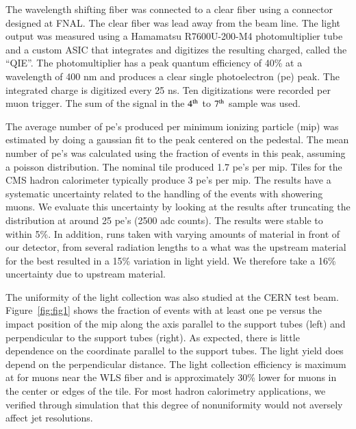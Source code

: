 \documentclass[review]{elsarticle}
\begin{document}
The wavelength shifting fiber was connected to a clear fiber using a
connector designed at FNAL.  The clear fiber was lead away from the
beam line.  The light output was measured using a Hamamatsu
R7600U-200-M4 photomultiplier tube and a custom ASIC that integrates
and digitizes the resulting charged, called the ``QIE''\cite{qie}.
The photomultiplier has a peak quantum efficiency of 40\% at a
wavelength of 400 nm and produces a clear single photoelectron (pe)
peak.  The integrated charge is digitized every 25 ns.  Ten
digitizations were recorded per muon trigger.  The sum of the signal
in the ${\rm 4^{th}}$ to ${\rm 7^{th}}$ sample was used.


The average number of pe's produced per minimum ionizing particle
(mip) was estimated by doing a gaussian fit to the peak centered on
the pedestal.  The mean number of pe's was calculated using the
fraction of events in this peak, assuming a poisson distribution.  The
nominal tile produced 1.7 pe's per mip.  Tiles for the CMS hadron
calorimeter typically produce 3 pe's per mip\cite{CMSHB}.  The results
have a systematic uncertainty related to the handling of the events
with showering muons.  We evaluate this uncertainty by looking at the
results after truncating the distribution at around 25 pe's (2500 adc
counts).  The results were stable to within 5\%.  In addition, runs
taken with varying amounts of material in front of our detector, from
several radiation lengths to a {\color{red} what was the upstream
  material for the best} resulted in a 15\% variation in light yield.
We therefore take a 16\% uncertainty due to upstream material.

The uniformity of the light collection was also studied at the CERN
test beam.  Figure~\ref{fig:fig1} shows the fraction of events with at
least one pe versus the impact position of the mip along the axis
parallel to the support tubes (left) and perpendicular to the support
tubes (right).  As expected, there is little dependence on the
coordinate parallel to the support tubes.  The light yield does depend
on the perpendicular distance.  The light collection efficiency is
maximum at for muons near the WLS fiber and is approximately 30\%
lower for muons in the center or edges of the tile.  For most hadron
calorimetry applications, we verified through simulation that this
degree of nonuniformity would not aversely affect jet resolutions.
\end{document}
